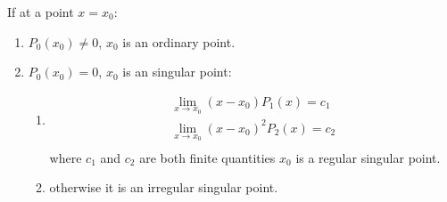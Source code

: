 \documentclass[../main.tex]{subfile}
\begin{document}
        If at a point $x=x_0$:
        \begin{enumerate}
        \item $P_0(x_0) \neq 0$, $x_0$ is an ordinary point.

        \item $P_0(x_0)=0$, $x_0$ is an singular point: \begin{enumerate}

        \item \begin{align}
                \lim_{x \to x_0}(x - x_0) P_1(x) = c_1\\
                \lim_{x \to x_0}(x - x_0)^2 P_2(x) = c_2\\
        \end{align}
        where $c_1$ and $c_2$ are both finite quantities $x_0$ is a regular singular point.

        \item otherwise it is an irregular singular point.
        \end{enumerate}
        \end{enumerate}
\end{document}
